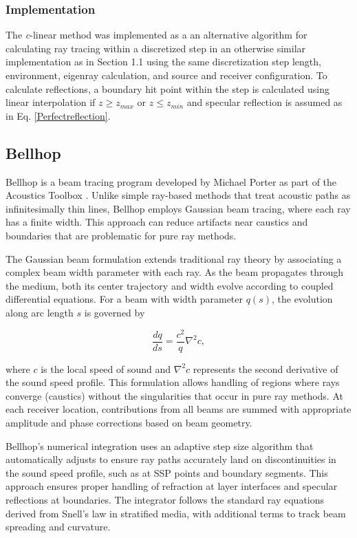 \documentclass[fleqn]{jaes}
\begin{document}
\subsubsection{Implementation}
The \textit{c}-linear method was implemented as a an alternative algorithm for calculating ray tracing within a discretized step in an otherwise similar implementation as in Section 1.1 using the same discretization step length, environment, eigenray calculation, and source and receiver configuration. To calculate reflections, a boundary hit point within the step is calculated using linear interpolation if $z\geq z_{max}$ or $z\leq z_{min}$ and specular reflection is assumed as in Eq. \ref{Perfectreflection}.

\subsection{Bellhop}

Bellhop is a beam tracing program developed by Michael Porter as part of the Acoustics Toolbox \cite{Porter}. Unlike simple ray-based methods that treat acoustic paths as infinitesimally thin lines, Bellhop employs Gaussian beam tracing, where each ray has a finite width. This approach can reduce artifacts near caustics and boundaries that are problematic for pure ray methods.

The Gaussian beam formulation extends traditional ray theory by associating a complex beam width parameter with each ray. As the beam propagates through the medium, both its center trajectory and width evolve according to coupled differential equations. For a beam with width parameter $q(s)$, the evolution along arc length $s$ is governed by

\begin{equation}
\frac{dq}{ds} = \frac{c^2}{q} \nabla^2 c,
\end{equation}

where $c$ is the local speed of sound and $\nabla^2 c$ represents the second derivative of the sound speed profile. This formulation allows handling of regions where rays converge (caustics) without the singularities that occur in pure ray methods. At each receiver location, contributions from all beams are summed with appropriate amplitude and phase corrections based on beam geometry.

Bellhop's numerical integration uses an adaptive step size algorithm that automatically adjusts to ensure ray paths accurately land on discontinuities in the sound speed profile, such as at SSP points and boundary segments. This approach ensures proper handling of refraction at layer interfaces and specular reflections at boundaries. The integrator follows the standard ray equations derived from Snell's law in stratified media, with additional terms to track beam spreading and curvature.
\end{document}
